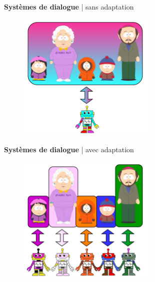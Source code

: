 \documentclass[french,handout]{beamer}
\begin{document}
    \begin{frame}{\textbf{Systèmes de dialogue} | sans adaptation}
        \begin{figure}
            \begin{center}
                \includegraphics[width=0.6\textwidth]{img/adap0.pdf}
            \end{center}
        \end{figure}
    \end{frame}

    \begin{frame}{\textbf{Systèmes de dialogue} | avec adaptation}
        \begin{figure}
            \begin{center}
                \includegraphics[width=0.6\textwidth]{img/adap1.pdf}
            \end{center}
        \end{figure}
    \end{frame}
\end{document}
